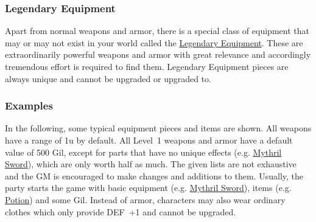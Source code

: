\subsubsection*{Legendary Equipment}
Apart from normal weapons and armor, there is a special class of equipment that may or may not exist in your world called the \hyperlink{leq}{Legendary Equipment}.
These are extraordinarily powerful weapons and armor with great relevance and accordingly tremendous effort is required to find them.
Legendary Equipment pieces are always unique and cannot be upgraded or upgraded to.
%
\vfill
%
\subsubsection*{Examples}
In the following, some typical equipment pieces and items are shown. 
All weapons have a range of 1u by default.
All Level~1 weapons and armor have a default value of 500 Gil, except for parts that have no unique effects (e.g. \hyperlink{mknife}{Mythril Sword}), which are only worth half as much.
The given lists are not exhaustive and the GM is encouraged to make changes and additions to them.
Usually, the party starts the game with basic equipment (e.g. \hyperlink{mknife}{Mythril Sword}), items (e.g. \hyperlink{item}{Potion}) and some Gil. 
Instead of armor, characters may also wear ordinary clothes which only provide DEF~+1 and cannot be upgraded.
%
\pagebreak
%




